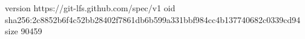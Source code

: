 version https://git-lfs.github.com/spec/v1
oid sha256:2c8852b6f4c52bb28402f7861db6b599a331bbf984cc4b137740682c0339cd94
size 90459
